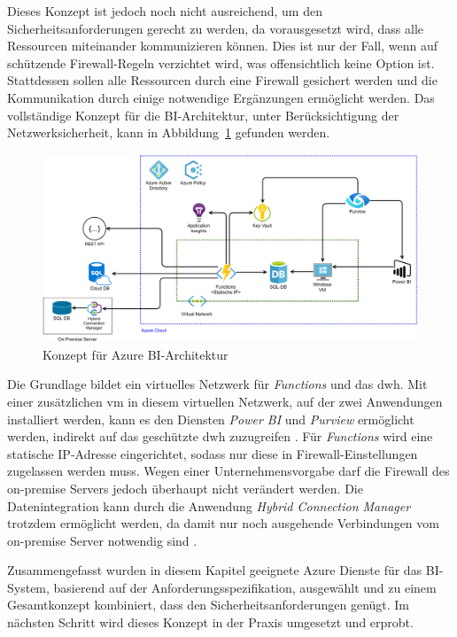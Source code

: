 Dieses Konzept ist jedoch noch nicht ausreichend, um den Sicherheitsanforderungen gerecht zu werden, da vorausgesetzt wird, dass alle Ressourcen miteinander kommunizieren können. Dies ist nur der Fall, wenn auf schützende Firewall-Regeln verzichtet wird, was offensichtlich keine Option ist. Stattdessen sollen alle Ressourcen durch eine Firewall gesichert werden und die Kommunikation durch einige notwendige Ergänzungen ermöglicht werden. Das vollständige Konzept für die BI-Architektur, unter Berücksichtigung der Netzwerksicherheit, kann in Abbildung~\ref{fig:chap03_4_konzeptArchitektur} gefunden werden.
 
 \begin{figure}[htbp]
 \centering
 \includegraphics[width=\textwidth]{gfx/konzept_2.png}
 \caption{Konzept für Azure BI-Architektur}
\label{fig:chap03_4_konzeptArchitektur}
\end{figure}

Die Grundlage bildet ein virtuelles Netzwerk für \textit{Functions} und das \ac{dwh}. Mit einer zusätzlichen \ac{vm} in diesem virtuellen Netzwerk, auf der zwei Anwendungen installiert werden, kann es den Diensten \textit{Power BI} und \textit{Purview} ermöglicht werden, indirekt auf das geschützte \ac{dwh} zuzugreifen \cite[vgl.][]{gunnarsson_pro_2020, msdoc_22_purviewSHIR}. Für \textit{Functions} wird eine statische IP-Adresse eingerichtet, sodass nur diese in Firewall-Einstellungen zugelassen werden muss. Wegen einer Unternehmensvorgabe darf die Firewall des on-premise Servers jedoch überhaupt nicht verändert werden. Die Datenintegration kann durch die Anwendung \textit{Hybrid Connection Manager} trotzdem ermöglicht werden, da damit nur noch ausgehende Verbindungen vom on-premise Server notwendig sind \cite[vgl.][]{msdoc_22_func_hybridConn}.

Zusammengefasst wurden in diesem Kapitel geeignete Azure Dienste für das BI-System, basierend auf der Anforderungsspezifikation, ausgewählt und zu einem Gesamtkonzept kombiniert, dass den Sicherheitsanforderungen genügt. Im nächsten Schritt wird dieses Konzept in der Praxis umgesetzt und erprobt.